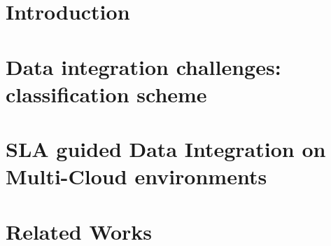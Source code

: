 \documentclass{llncs}
\begin{document}
%



\section{Introduction}
\label{sec:intro}
 

\section{Data integration challenges: classification scheme}\label{sec:sm}


\section{SLA guided Data Integration on Multi-Cloud environments}\label{sec:approach}

\section{Related Works}\label{sec:rw}


\end{document}
